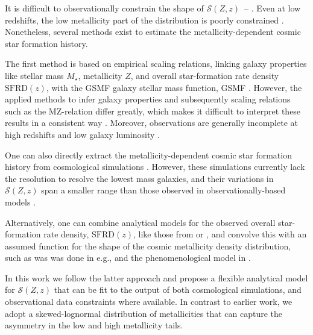 \documentclass[linenumbers,twocolumn]{aastex631}
\newcommand{\SFRDzZ}{\ensuremath{\mathcal{S}(Z,z)}\xspace}
\newcommand{\SFRDz}{\ensuremath{\mathrm{SFRD}(z)}\xspace}
\begin{document}
It is difficult to observationally constrain the shape of \SFRDzZ\ -- \citep[see e.g., ][for discussion of relevant observational caveats]{Chruslinska2019_obs,Boco+2021}. Even at low redshifts, the low metallicity part of the distribution is poorly constrained \citep{Chruslinska+2021}.
Nonetheless, several methods exist to estimate the metallicity-dependent cosmic star formation history. 

The first method is based on empirical scaling relations, linking galaxy properties like stellar mass $M_{\star}$, metallicity $Z$, and overall star-formation rate density \SFRDz, with the GSMF galaxy stellar mass function, GSMF \citep[see e.g.][]{Dominik+2013}. However, the applied methods to infer galaxy properties and subsequently scaling relations such as the MZ-relation differ greatly, which makes it difficult to interpret these results in a consistent way \citep[e.g.,][]{KewleyEllison2008,MaiolinoMannucci2019,Cresci+2019}. Moreover, observations are generally incomplete at high redshifts and low galaxy luminosity \citep[e.g.,][]{Chruslinska+2021}.

One can also directly extract the metallicity-dependent cosmic star formation history from cosmological simulations \citep[e.g.][]{Mapelli2017, Briel+2022_rates}. However, these simulations currently lack the resolution to resolve the lowest mass galaxies, and their variations in \SFRDzZ span a smaller range than those observed in observationally-based models \citep{Pakmor+2022}.

Alternatively, one can combine analytical models for the observed overall star-formation rate density, \SFRDz, like those from \cite{MadauDickinson2014} or \cite{Madau+2017}, and convolve this with an assumed function for the shape of the cosmic metallicity density distribution, such as was was done in e.g., \cite{LangerNorman2006} and the phenomenological model in \cite{Neijssel+2019}.

In this work we follow the latter approach and propose a flexible analytical model for \SFRDzZ that can be fit to the output of both cosmological simulations, and observational data constraints where available. 
In contrast to earlier work, we adopt a skewed-lognormal distribution of metallicities that can capture the asymmetry in the low and high metallicity tails. 
\end{document}
